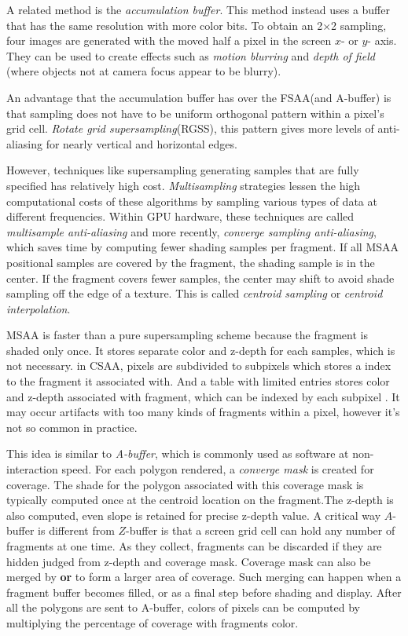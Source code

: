 \documentclass[10pt, a4paper]{article}
\begin{document}
                    A related method is the \emph{accumulation buffer}. This method instead uses a buffer that has the same resolution with more color bits. To obtain an 2$\times$2 sampling, four images are generated with the moved half a pixel in the screen $x$- or $y$- axis. They can be used to create effects such as \emph{motion blurring} and \emph{depth of field} (where objects not at camera focus appear to be blurry). 
                    
                    An advantage that the accumulation buffer has over the FSAA(and A-buffer) is that sampling does not have to be uniform orthogonal pattern within a pixel's grid cell. \emph{Rotate grid supersampling}(RGSS), this pattern gives more levels of anti-aliasing for nearly vertical and horizontal edges. 
                    
                    However, techniques like supersampling generating samples that are fully specified has relatively high cost. \emph{Multisampling} strategies lessen the high computational costs of these algorithms by sampling various types of data at different frequencies. Within GPU hardware, these techniques are called \emph{multisample anti-aliasing} and more recently, \emph{converge sampling anti-aliasing}, which saves time by computing fewer shading samples per fragment. If all MSAA positional samples are covered by the fragment, the shading sample is in the center. If the fragment covers fewer samples, the center may shift to avoid shade sampling off the edge of a texture. This is called \emph{centroid sampling} or \emph{centroid interpolation}.

                    MSAA is faster than a pure supersampling scheme because the fragment is shaded only once. It stores separate color and z-depth for each samples, which is not necessary. in CSAA, pixels are subdivided to subpixels which stores a index to the fragment it associated with. And a table with limited entries stores color and z-depth associated with fragment, which can be indexed by each subpixel  . It may occur artifacts with too many kinds of fragments within a pixel, however it's not so common in practice.

                    This idea is similar to \emph{A-buffer}, which is commonly used as software at non-interaction speed. For each polygon rendered, a \emph{converge mask} is created for coverage. The shade for the polygon associated with this coverage mask is typically computed once at the centroid location on the fragment.The z-depth is also computed, even slope is retained for precise z-depth value. A critical way $A$-buffer is different from $Z$-buffer is that a screen grid cell can hold any number of fragments at one time. As they collect, fragments can be discarded if they are hidden judged from z-depth and coverage mask. Coverage mask can also be merged by \textbf{or} to form a larger area of coverage. Such merging can happen when a fragment buffer becomes filled, or as a final step before shading and display. After all the polygons are sent to A-buffer, colors of pixels can be computed by multiplying the percentage of coverage with fragments color. 
\end{document}
